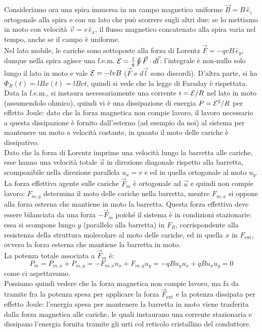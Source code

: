 Consideriamo ora una spira immersa in un campo magnetico uniforme $ \vec{B} = B \,\hat{e}_z $ ortogonale alla spira e con un lato che può scorrere sugli altri due: se lo mettiamo in moto con velocità $ \vec{v} = v \,\hat{e}_x $, il flusso magnetico concatenato alla spira varia nel tempo, anche se il campo è uniforme. \\ 
%
Nel lato mobile, le cariche sono sottoposte alla forza di Lorentz $ \vec{F} = -qvB \,\hat{e}_y $, dunque nella spira agisce una f.e.m. $ \mathcal{E} = \frac{1}{q} \oint \vec{F}\cdot d\vec{l} $: l'integrale è non-nullo solo lungo il lato in moto e vale $ \mathcal{E} = -lvB $ ($ \vec{F} $ e $ d\vec{l} $ sono discordi). D'altra parte, si ha $ \Phi_B(t) = lB x(t) = lB v t $, quindi si vede che la legge di Faraday è rispettata. \\ 
%
Data la f.e.m., si instaura necessariamente una corrente $ i = \mathcal{E} / R $ nel lato in moto (assumendolo ohmico), quindi vi è una dissipazione di energia $ P = \mathcal{E}^2 / R $ per effetto Joule: dato che la forza magnetica non compie lavoro, il lavoro necessario a questa dissipazione è fornito dall'esterno (ad esempio da noi) al sistema per mantenere un moto a velocità costante, in quanto il moto delle cariche è dissipativo. \\ 
%
Dato che la forza di Lorentz imprime una velocità lungo la barretta alle cariche, esse hanno una velocità totale $ \vec{u} $ in direzione diagonale rispetto alla barretta, scomponibile nella direzione parallela $ u_x = v $ e ed in quella ortogonale al moto $ u_y $. La forza effettiva agente sulle cariche $ \vec{F}_m $ è ortogonale ad $ \vec{u} $ e quindi non compie lavoro: $ F_{m,y} $ determina il moto delle cariche nella barretta, mentre $ F_{m,x} $ si oppone alla forza esterna che mantiene in moto la barretta. Questa forza effettiva deve essere bilanciata da una forza $ -\vec{F}_m $ poiché il sistema è in condizioni stazionarie: essa si scompone lungo $ y $ (parallelo alla barretta) in $ F_R $, corrispondente alla resistenza della struttura molecolare al moto delle cariche, ed in quella $ x $ in $ F_{\text{ext}} $, ovvero la forza esterna che mantiene la barretta in moto. \\ 
%
La potenza totale associata a $ \vec{F}_m $  è:
\begin{equation}
	P_m = P_{m,x} + P_{m,y} = -F_{m,x}u_x + F_{m,y}u_y = -qBu_yu_x + qBu_xu_y = 0
	\label{eq:5}
\end{equation}
come ci aspettavamo. \\ 
%
Possiamo quindi vedere che la forza magnetica non compie lavoro, ma fa da tramite fra la potenza spesa per applicare la forza $ \vec{F}_{\text{ext}} $ e la potenza dissipata per effetto Joule: l'energia spesa per mantenere la barretta in moto viene trasferita dalla forza magnetica alle cariche, le quali instaurano una corrente stazionaria e dissipano l'energia fornita tramite gli urti col reticolo cristallino del conduttore.

